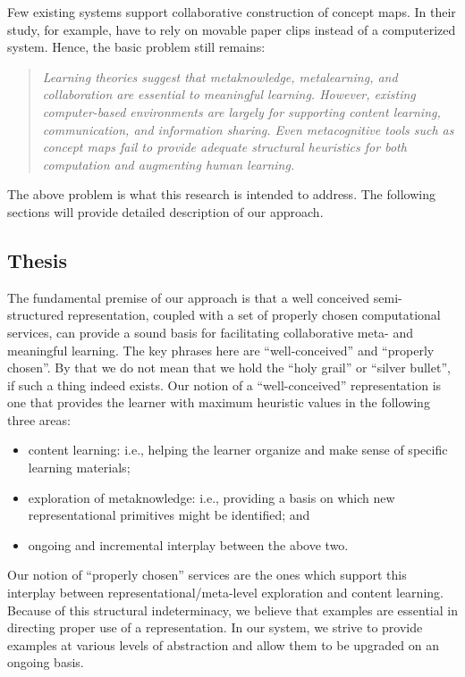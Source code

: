 Few existing systems support collaborative construction of concept maps.
In their study, for example, \cite{Roth92} have to rely on movable paper
clips instead of a computerized system. Hence, the basic problem still
remains:

\begin{quotation}
  {\it Learning theories suggest that metaknowledge, metalearning, and
  collaboration are essential to meaningful learning. However, existing
  computer-based environments are largely for supporting content learning,
  communication, and information sharing. Even metacognitive tools such as
  concept maps fail to provide adequate structural heuristics for both
  computation and augmenting human learning.}
\end{quotation}

The above problem is what this research is intended to address. The
following sections will provide detailed description of our approach.


\subsection{Thesis}
\label{sec:claims}

The fundamental premise of our approach is that a well conceived
semi-structured representation, coupled with a set of properly chosen
computational services, can provide a sound basis for facilitating
collaborative meta- and meaningful learning. The key phrases here are
``well-conceived'' and ``properly chosen''. By that we do not mean that we
hold the ``holy grail'' or ``silver bullet'', if such a thing indeed
exists. Our notion of a ``well-conceived'' representation is one that
provides the learner with maximum heuristic values in the following three
areas:

\begin{itemize}
\item content learning: i.e., helping the learner organize and make sense
  of specific learning materials;
  
\item exploration of metaknowledge: i.e., providing a basis on which new
  representational primitives might be identified; and
  
\item ongoing and incremental interplay between the above two.
\end{itemize}

Our notion of ``properly chosen'' services are the ones which support this
interplay between representational/meta-level exploration and content
learning.  Because of this structural indeterminacy, we believe that examples are
essential in directing proper use of a representation. In our system, we
strive to provide examples at various levels of abstraction and allow them
to be upgraded on an ongoing basis.

